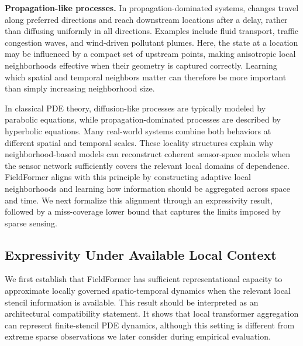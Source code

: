 \noindent\textbf{Propagation-like processes.}
In propagation-dominated systems, changes travel along preferred directions and reach downstream locations after a delay, rather than diffusing uniformly in all directions. Examples include fluid transport, traffic congestion waves, and wind-driven pollutant plumes. Here, the state at a location may be influenced by a compact set of upstream points, making anisotropic local neighborhoods effective when their geometry is captured correctly. Learning which spatial and temporal neighbors matter can therefore be more important than simply increasing neighborhood size.

In classical PDE theory, diffusion-like processes are typically modeled by parabolic equations, while propagation-dominated processes are described by hyperbolic equations. Many real-world systems combine both behaviors at different spatial and temporal scales. These locality structures explain why neighborhood-based models can reconstruct coherent sensor-space models when the sensor network sufficiently covers the relevant local domains of dependence. FieldFormer aligns with this principle by constructing adaptive local neighborhoods and learning how information should be aggregated across space and time. We next formalize this alignment through an expressivity result, followed by a miss-coverage lower bound that captures the limits imposed by sparse sensing.

\subsection{Expressivity Under Available Local Context}

We first establish that FieldFormer has sufficient representational capacity to approximate locally governed spatio-temporal dynamics when the relevant local stencil information is available. This result should be interpreted as an architectural compatibility statement. It shows that local transformer aggregation can represent finite-stencil PDE dynamics, although this setting is different from extreme sparse observations we later consider during empirical evaluation.

